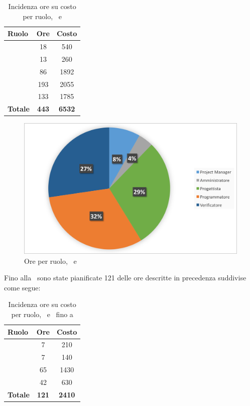 \begin{table}[h]
	\begin{center}
		\begin{tabular}{|l|c|c|}
			\hline
			\textbf{Ruolo}	& \textbf{Ore} &	\textbf{Costo}	 \\
			\hline
			\Pm &	18 & 540\\
			\hline
			\Am	&	13 & 260\\
			\hline
			\Prog	&	86 & 1892\\
			\hline
			\Progr	&	193 & 2055\\
			\hline
			\Ver	&	133 & 1785\\
			\hline
			\textbf{Totale} &	 \textbf{443}	&	\textbf{6532}\\
			\hline
		\end{tabular}
	\end{center}
	\caption{Incidenza ore su costo per ruolo, \PD\ e \COD}
\end{table}

\begin{figure}[H]
	\centering 
	\includegraphics[scale=0.7]{Immagini/GraficiTorteSezione6/PDCOD.png}
	\caption{Ore per ruolo, \PD\ e \COD}
\end{figure}

\newpage
Fino alla \RP\ sono state pianificate 121 delle ore descritte in precedenza suddivise come segue:

\begin{table}[h]
	\begin{center}
		\begin{tabular}{|l|c|c|}
			\hline
			\textbf{Ruolo}	& \textbf{Ore} &	\textbf{Costo}	\\
			\hline
			\Pm &	7 & 210\\
			\hline
			\Am	&	7 & 140\\
			\hline
			\Prog	&	65 & 1430\\
			\hline
			\Ver	&	42 & 630\\
			\hline
			\textbf{Totale} &	 \textbf{121}	&	\textbf{2410}\\
			\hline
		\end{tabular}
	\end{center}
	\caption{Incidenza ore su costo per ruolo, \PD\ e \COD\ fino a \RP}
\end{table}

